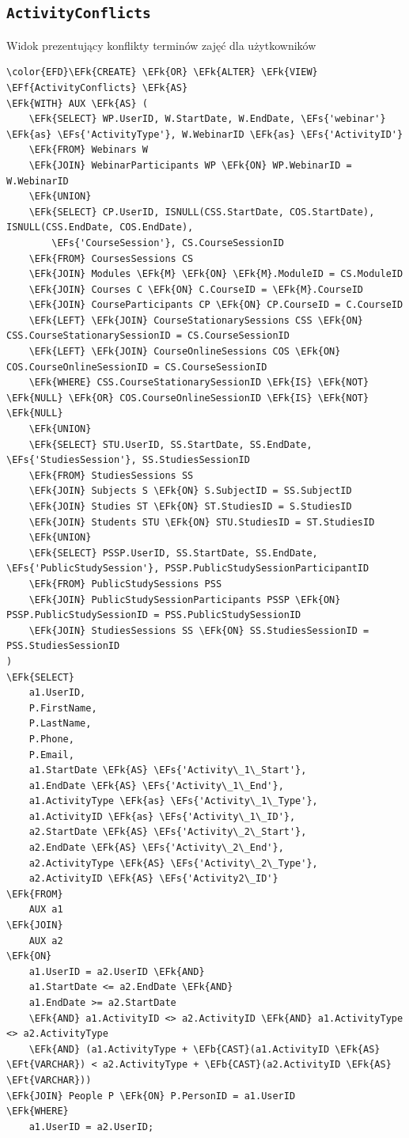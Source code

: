 \documentclass[11pt]{article}
\newcommand{\EFs}[1]{\textcolor{EFs}{#1}} %
\newcommand{\EFk}[1]{\textcolor{EFk}{\textbf{#1}}} %
\newcommand{\EFb}[1]{\textcolor{EFb}{\textbf{#1}}} %
\newcommand{\EFf}[1]{\textcolor{EFf}{#1}} %
\newcommand{\EFt}[1]{\textcolor{EFt}{\textbf{#1}}} %
\begin{document}
\subsection{\texttt{ActivityConflicts}}
\label{sec:orge434bac}
Widok prezentujący konflikty terminów zajęć dla użytkowników
\begin{Code}
\begin{Verbatim}
\color{EFD}\EFk{CREATE} \EFk{OR} \EFk{ALTER} \EFk{VIEW} \EFf{ActivityConflicts} \EFk{AS}
\EFk{WITH} AUX \EFk{AS} (
    \EFk{SELECT} WP.UserID, W.StartDate, W.EndDate, \EFs{'webinar'} \EFk{as} \EFs{'ActivityType'}, W.WebinarID \EFk{as} \EFs{'ActivityID'}
    \EFk{FROM} Webinars W 
    \EFk{JOIN} WebinarParticipants WP \EFk{ON} WP.WebinarID = W.WebinarID
    \EFk{UNION}
    \EFk{SELECT} CP.UserID, ISNULL(CSS.StartDate, COS.StartDate), ISNULL(CSS.EndDate, COS.EndDate),
        \EFs{'CourseSession'}, CS.CourseSessionID
    \EFk{FROM} CoursesSessions CS 
    \EFk{JOIN} Modules \EFk{M} \EFk{ON} \EFk{M}.ModuleID = CS.ModuleID
    \EFk{JOIN} Courses C \EFk{ON} C.CourseID = \EFk{M}.CourseID
    \EFk{JOIN} CourseParticipants CP \EFk{ON} CP.CourseID = C.CourseID
    \EFk{LEFT} \EFk{JOIN} CourseStationarySessions CSS \EFk{ON} CSS.CourseStationarySessionID = CS.CourseSessionID
    \EFk{LEFT} \EFk{JOIN} CourseOnlineSessions COS \EFk{ON} COS.CourseOnlineSessionID = CS.CourseSessionID
    \EFk{WHERE} CSS.CourseStationarySessionID \EFk{IS} \EFk{NOT} \EFk{NULL} \EFk{OR} COS.CourseOnlineSessionID \EFk{IS} \EFk{NOT} \EFk{NULL}
    \EFk{UNION}
    \EFk{SELECT} STU.UserID, SS.StartDate, SS.EndDate, \EFs{'StudiesSession'}, SS.StudiesSessionID
    \EFk{FROM} StudiesSessions SS
    \EFk{JOIN} Subjects S \EFk{ON} S.SubjectID = SS.SubjectID
    \EFk{JOIN} Studies ST \EFk{ON} ST.StudiesID = S.StudiesID
    \EFk{JOIN} Students STU \EFk{ON} STU.StudiesID = ST.StudiesID
    \EFk{UNION}
    \EFk{SELECT} PSSP.UserID, SS.StartDate, SS.EndDate, \EFs{'PublicStudySession'}, PSSP.PublicStudySessionParticipantID
    \EFk{FROM} PublicStudySessions PSS 
    \EFk{JOIN} PublicStudySessionParticipants PSSP \EFk{ON} PSSP.PublicStudySessionID = PSS.PublicStudySessionID
    \EFk{JOIN} StudiesSessions SS \EFk{ON} SS.StudiesSessionID = PSS.StudiesSessionID
)
\EFk{SELECT} 
    a1.UserID, 
    P.FirstName, 
    P.LastName, 
    P.Phone,
    P.Email,
    a1.StartDate \EFk{AS} \EFs{'Activity\_1\_Start'}, 
    a1.EndDate \EFk{AS} \EFs{'Activity\_1\_End'}, 
    a1.ActivityType \EFk{as} \EFs{'Activity\_1\_Type'},
    a1.ActivityID \EFk{as} \EFs{'Activity\_1\_ID'},
    a2.StartDate \EFk{AS} \EFs{'Activity\_2\_Start'}, 
    a2.EndDate \EFk{AS} \EFs{'Activity\_2\_End'},
    a2.ActivityType \EFk{AS} \EFs{'Activity\_2\_Type'},
    a2.ActivityID \EFk{AS} \EFs{'Activity2\_ID'}
\EFk{FROM} 
    AUX a1
\EFk{JOIN} 
    AUX a2 
\EFk{ON} 
    a1.UserID = a2.UserID \EFk{AND}
    a1.StartDate <= a2.EndDate \EFk{AND} 
    a1.EndDate >= a2.StartDate 
    \EFk{AND} a1.ActivityID <> a2.ActivityID \EFk{AND} a1.ActivityType <> a2.ActivityType
    \EFk{AND} (a1.ActivityType + \EFb{CAST}(a1.ActivityID \EFk{AS} \EFt{VARCHAR}) < a2.ActivityType + \EFb{CAST}(a2.ActivityID \EFk{AS} \EFt{VARCHAR}))
\EFk{JOIN} People P \EFk{ON} P.PersonID = a1.UserID
\EFk{WHERE} 
    a1.UserID = a2.UserID;
\end{Verbatim}
\end{Code}
\end{document}
